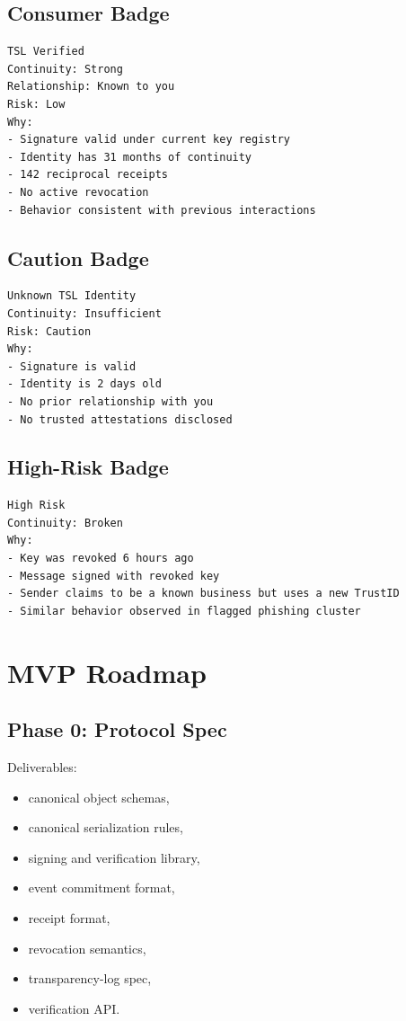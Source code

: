\documentclass[11pt]{article}
\begin{document}
\subsection{Consumer Badge}

\begin{lstlisting}[style=tslcode]
TSL Verified
Continuity: Strong
Relationship: Known to you
Risk: Low
Why:
- Signature valid under current key registry
- Identity has 31 months of continuity
- 142 reciprocal receipts
- No active revocation
- Behavior consistent with previous interactions
\end{lstlisting}

\subsection{Caution Badge}

\begin{lstlisting}[style=tslcode]
Unknown TSL Identity
Continuity: Insufficient
Risk: Caution
Why:
- Signature is valid
- Identity is 2 days old
- No prior relationship with you
- No trusted attestations disclosed
\end{lstlisting}

\subsection{High-Risk Badge}

\begin{lstlisting}[style=tslcode]
High Risk
Continuity: Broken
Why:
- Key was revoked 6 hours ago
- Message signed with revoked key
- Sender claims to be a known business but uses a new TrustID
- Similar behavior observed in flagged phishing cluster
\end{lstlisting}

\section{MVP Roadmap}

\subsection{Phase 0: Protocol Spec}

Deliverables:

\begin{itemize}
    \item canonical object schemas,
    \item canonical serialization rules,
    \item signing and verification library,
    \item event commitment format,
    \item receipt format,
    \item revocation semantics,
    \item transparency-log spec,
    \item verification API.
\end{itemize}
\end{document}
